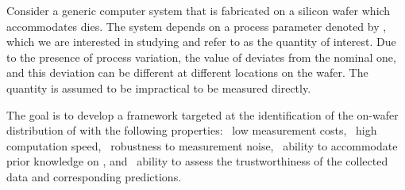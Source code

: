 Consider a generic computer system that is fabricated on a silicon wafer which
accommodates \nd dies. The system depends on a process parameter denoted by \g,
which we are interested in studying and refer to as the quantity of interest.
Due to the presence of process variation, the value of \g deviates from the
nominal one, and this deviation can be different at different locations on the
wafer. The quantity is assumed to be impractical to be measured directly.

The goal is to develop a framework targeted at the identification of the
on-wafer distribution of \g with the following properties: \one~low measurement
costs, \two~high computation speed, \three~robustness to measurement noise,
\four~ability to accommodate prior knowledge on \g, and \five~ability to assess
the trustworthiness of the collected data and corresponding predictions.

